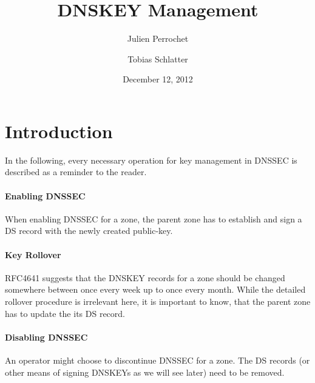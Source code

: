 \documentclass[a4paper, twocolumn]{scrartcl}
\title{DNSKEY Management}
\author{Julien Perrochet \and Tobias Schlatter}
\date{December 12, 2012}
\begin{document}
\maketitle

\section{Introduction}

In the following, every necessary operation for key management in
DNSSEC is described as a reminder to the reader.

\paragraph{Enabling DNSSEC} When enabling DNSSEC for a zone, the
parent zone has to establish and sign a DS record with the newly
created public-key.

\paragraph{Key Rollover} RFC4641 \cite{RFC4641} suggests that the DNSKEY
records for a zone should be changed somewhere between once every week
up to once every month. While the detailed rollover procedure is
irrelevant here, it is important to know, that the parent zone has to
update the its DS record.

\paragraph{Disabling DNSSEC} An operator might choose to discontinue
DNSSEC for a zone. The DS records (or other means of signing DNSKEYs
as we will see later) need to be removed.

\nocite{*}


\end{document}
